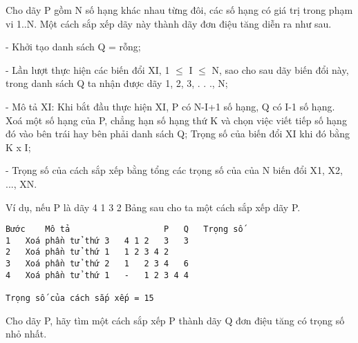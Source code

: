 Cho dãy P gồm N số hạng khác nhau từng đôi, các số hạng có giá trị trong phạm vi 1..N. Một cách sắp xếp dãy này thành dãy đơn điệu tăng diễn ra như sau.  

   -         Khởi tạo danh sách Q = rỗng;  

   -         Lần lượt thực hiện các biến đổi XI, 1  $\le$  I  $\le$ N, sao cho sau dãy biến đổi này, trong danh sách Q ta nhận được dãy 1, 2, 3, . . ., N;  

   -         Mô tả XI: Khi bắt đầu thực hiện XI, P có N-I+1 số hạng, Q có I-1 số hạng. Xoá một số hạng của P, chẳng hạn số hạng thứ K và chọn việc viết tiếp số hạng đó vào bên trái hay bên phải danh sách Q; Trọng số của biến đổi XI khi đó bằng K x I;  

   -         Trọng số của cách sắp xếp bằng tổng các trọng số của của N biến đổi X1, X2, ..., XN.  

   Ví dụ, nếu P là dãy 4 1 3 2 Bảng sau cho ta một cách sắp xếp dãy P.  
\begin{verbatim}
Bước	Mô tả	                P	Q	Trọng số
1	Xoá phần tử thứ 3	4 1 2	3	3
2	Xoá phần tử thứ 1	1 2	3 4	2
3	Xoá phần tử thứ 2	1	2 3 4	6
4	Xoá phần tử thứ 1	-	1 2 3 4	4

Trọng số của cách sắp xếp = 15

\end{verbatim}

   Cho dãy P, hãy tìm một cách sắp xếp P thành dãy Q đơn điệu tăng có trọng số nhỏ nhất.  



\